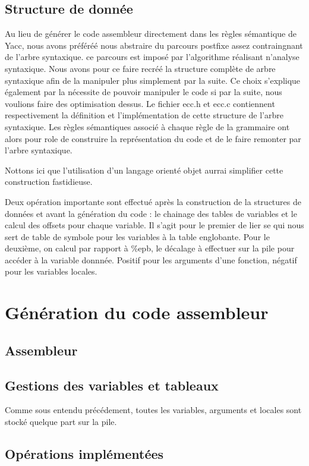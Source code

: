 \documentclass{article}
\begin{document}
\subsection{Structure de donnée}

Au lieu de générer le code assembleur directement dans les règles sémantique de Yacc, nous avons préféréé nous abstraire du parcours 
postfixe assez contraingnant de l'arbre syntaxique. ce parcours est imposé par l'algorithme réalisant n'analyse syntaxique. Nous avons
pour ce faire recréé la structure complète de arbre syntaxique afin de la manipuler plus simplement par la suite. Ce choix s'explique 
également par la nécessite de pouvoir manipuler le code si par la suite, nous voulions faire des optimisation dessus.
Le fichier ecc.h et ecc.c contiennent respectivement la définition et l'implémentation de cette structure de l'arbre syntaxique.
Les règles sémantiques associé à chaque règle de la grammaire ont alors pour role de construire la représentation du code et de le faire
remonter par l'arbre syntaxique.

Nottons ici que l'utilisation d'un langage orienté objet aurrai simplifier cette construction fastidieuse.

Deux opération importante sont effectué après la construction de la structures de données et avant la génération du code : 
le chainage des tables de variables et le calcul des offsets pour chaque variable.
Il s'agit pour le premier de lier se qui nous sert de table de symbole pour les variables à la table englobante.
Pour le deuxième, on calcul par rapport à \%epb, le décalage à effectuer sur la pile pour accéder à la variable donnnée. Positif 
pour les arguments d'une fonction, négatif pour les variables locales.

\section{Génération du code assembleur}

\subsection{Assembleur}
\subsection{Gestions des variables et tableaux}

Comme sous entendu précédement, toutes les variables, arguments et locales sont stocké quelque part sur la pile.
\subsection{Opérations implémentées}
\end{document}
